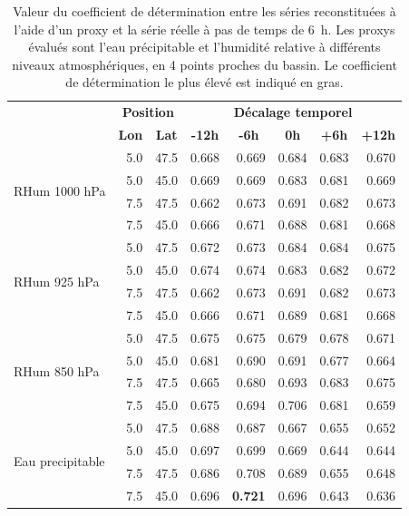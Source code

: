 \documentclass[hess]{copernicus}
\begin{document}
\begin{table}[htb]
	\caption{Valeur du coefficient de détermination entre les séries reconstituées à l'aide d'un proxy et la série réelle à pas de temps de 6~h. Les proxys évalués sont l'eau précipitable et l'humidité relative à différents niveaux atmosphériques, en 4 points proches du bassin. Le coefficient de détermination le plus élevé est indiqué en gras.}
	\begin{center}
		\begin{tabular}{|l|rr|rrrrr|}
			\cline{ 2- 8}
			\multicolumn{1}{l}{} & \multicolumn{2}{|c|}{\textbf{Position}} &  \multicolumn{5}{c|}{\textbf{Décalage temporel}} \\
			\multicolumn{1}{l}{} & \multicolumn{1}{|c}{\textbf{Lon}} & \multicolumn{1}{c|}{\textbf{Lat}} & \multicolumn{1}{c}{\textbf{-12h}} & \multicolumn{1}{c}{\textbf{-6h}} & \multicolumn{1}{c}{\textbf{0h}} & \multicolumn{1}{c}{\textbf{+6h}} & \multicolumn{1}{c|}{\textbf{+12h}} \\ \hline
			\multirow{ 4}{*}{RHum 1000 hPa} & 5.0 & 47.5 & 0.668 & 0.669 & 0.684 & 0.683 & 0.670 \\
			& 5.0 & 45.0 & 0.669 & 0.669 & 0.683 & 0.681 & 0.669 \\
			& 7.5 & 47.5 & 0.662 & 0.673 & 0.691 & 0.682 & 0.673 \\
			& 7.5 & 45.0 & 0.666 & 0.671 & 0.688 & 0.681 & 0.668 \\ \hline
			\multirow{ 4}{*}{RHum 925 hPa} & 5.0 & 47.5 & 0.672 & 0.673 & 0.684 & 0.684 & 0.675 \\
			& 5.0 & 45.0 & 0.674 & 0.674 & 0.683 & 0.682 & 0.672 \\
			& 7.5 & 47.5 & 0.662 & 0.673 & 0.691 & 0.682 & 0.673 \\
			& 7.5 & 45.0 & 0.666 & 0.671 & 0.689 & 0.681 & 0.668 \\ \hline
			\multirow{ 4}{*}{RHum 850 hPa} & 5.0 & 47.5 & 0.675 & 0.675 & 0.679 & 0.678 & 0.671 \\
			& 5.0 & 45.0 & 0.681 & 0.690 & 0.691 & 0.677 & 0.664 \\
			& 7.5 & 47.5 & 0.665 & 0.680 & 0.693 & 0.683 & 0.675 \\
			& 7.5 & 45.0 & 0.675 & 0.694 & 0.706 & 0.681 & 0.659 \\ \hline
			\multirow{ 4}{*}{Eau precipitable} & 5.0 & 47.5 & 0.688 & 0.687 & 0.667 & 0.655 & 0.652 \\
			& 5.0 & 45.0 & 0.697 & 0.699 & 0.669 & 0.644 & 0.644 \\
			& 7.5 & 47.5 & 0.686 & 0.708 & 0.689 & 0.655 & 0.648 \\
			& 7.5 & 45.0 & 0.696 & \textbf{0.721} & 0.696 & 0.643 & 0.636 \\ \hline
		\end{tabular}
	\end{center}
	\label{tab:fenetre_glissante:Serie_proxy_correlations}
\end{table}
\end{document}
